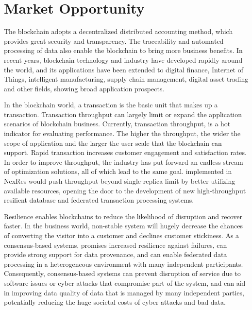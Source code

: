 \section{Market Opportunity}
\par The blockchain adopts a decentralized distributed accounting method, which provides great security 
and transparency. The traceability and automated processing of data also enable the blockchain to 
bring more business benefits. In recent years, blockchain technology and industry have developed 
rapidly around the world, and its applications have been extended to digital finance, Internet of 
Things, intelligent manufacturing, supply chain management, digital asset trading and other fields, 
showing broad application prospects.

\par In the blockchain world, a transaction is the basic unit that makes up a transaction. Transaction 
throughput can largely limit or expand the application scenarios of blockchain business. Currently, 
transaction throughput, is a hot indicator for evaluating performance. The higher the throughput, 
the wider the scope of application and the larger the user scale that the blockchain can support. 
Rapid transaction increases customer engagement and satisfaction rates. In order to improve throughput, 
the industry has put forward an endless stream of optimization solutions, all of which lead to the same 
goal. \RCC{} implemented in NexRes would push throughput beyond single-replica limit by better 
utilizing available resources, opening the door to the development of new high-throughput resilient 
database and federated transaction processing systems.

\par Resilience enables blockchains to reduce the likelihood of disruption and recover faster. In the business 
world, non-stable system will hugely decrease the chances of converting the visitor into a customer 
and declines customer stickiness. As a consensus-based systems, \RCC{} promises increased resilience against 
failures, can provide strong support for data provenance, and can enable federated data processing in a 
heterogeneous environment with many independent participants. Consequently, consensus-based systems can 
prevent disruption of service due to software issues or cyber attacks that compromise part of the system, 
and can aid in improving data quality of data that is managed by many independent parties, potentially 
reducing the huge societal costs of cyber attacks and bad data.
